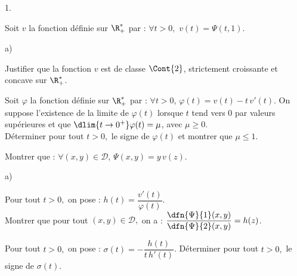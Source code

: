 \documentclass[11pt]{article}%
\begin{document}
\begin{noliste}{1.}
 \setlength{\itemsep}{4mm}
 \setcounter{enumi}{4}
 \item Soit $v$ la fonction définie sur $\R_+^*$ par : $\forall t > 0,$ 
 $v(t)=\Psi(t,1).$
 \begin{noliste}{a)}
  \setlength{\itemsep}{2mm}
  \item Justifier que la fonction $v$ est de classe $\Cont{2}$, 
  strictement croissante et concave sur $\R_+^*$.
  
  

  
  
  
  
  
  
  
  \item Soit $\varphi$ la fonction définie sur $\R_+^*$ par : $\forall 
  t >0$, $\varphi(t)=v(t)-t \, v'(t)$. On suppose l'existence de la 
  limite de $\varphi(t)$ lorsque $t$ tend vers 0 par valeurs supérieures
  et que $\dlim{t \to 0^+} \varphi(t)=\mu$, avec $\mu \geq 0$.\\
  Déterminer pour tout $t>0,$ le signe de $\varphi(t)$ et montrer que 
  $\mu \leq 1$.
  
  

  
  \item Montrer que : $\forall (x,y) \in \mathcal{D}$, 
  $\Psi(x,y)=y \, v(z)$.
  
  
 \end{noliste}
 
 
 
 
 
 
 
 
 
 \item\label{6} 
 \begin{noliste}{a)}
  \setlength{\itemsep}{2mm}
  \item Pour tout $t>0,$ on pose : $h(t)=\dfrac{v'(t)}{\varphi(t)}$.\\
  Montrer que pour tout $(x,y) \in \mathcal{D},$ on a : 
  $\dfrac{\dfn{\Psi}{1}(x,y)}{\dfn{\Psi}{2}(x,y)}=h(z)$.
  
  

  
  \item Pour tout $t>0,$ on pose : $\sigma(t)=-\dfrac{h(t)}{t \, 
  h'(t)}$. Déterminer pour tout $t>0,$ le signe de $\sigma(t)$.
  
  
 \end{noliste}
 
 
 
 
 

\end{noliste}
\end{document}
